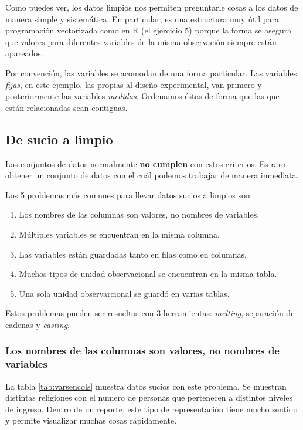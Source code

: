 \documentclass[]{article}
\begin{document}
Como puedes ver, los datos limpios nos permiten preguntarle cosas a los
datos de manera simple y sistemática. En particular, es una estructura
muy útil para programación vectorizada como en R (el ejercicio 5) porque
la forma se asegura que valores para diferentes variables de la misma
observación siempre están apareados.

Por convención, las variables se acomodan de una forma particular. Las
variables \emph{fijas}, en este ejemplo, las propias al diseño
experimental, van primero y posteriormente las variables \emph{medidas}.
Ordenamos éstas de forma que las que están relacionadas sean contiguas.

\subsection{De sucio a limpio}\label{de-sucio-a-limpio}

Los conjuntos de datos normalmente \textbf{no cumplen} con estos
criterios. Es raro obtener un conjunto de datos con el cuál podemos
trabajar de manera inmediata.

Los 5 problemas más comunes para llevar datos sucios a limpios son

\begin{enumerate}
\def\labelenumi{\arabic{enumi}.}
\itemsep1pt\parskip0pt
\item
  Los nombres de las columnas son valores, no nombres de variables.
\item
  Múltiples variables se encuentran en la misma columna.
\item
  Las variables están guardadas tanto en filas como en columnas.
\item
  Muchos tipos de unidad observacional se encuentran en la misma tabla.
\item
  Una sola unidad observarcional se guardó en varias tablas.
\end{enumerate}

Estos problemas pueden ser resueltos con 3 herramientas: \emph{melting},
separación de cadenas y \emph{casting}.

\subsubsection{Los nombres de las columnas son valores, no nombres de
variables}\label{los-nombres-de-las-columnas-son-valores-no-nombres-de-variables}

La tabla \ref{tab:varsencols} muestra datos sucios con este problema. Se
muestran distintas religiones con el numero de personas que pertenecen a
distintos niveles de ingreso. Dentro de un reporte, este tipo de
representación tiene mucho sentido y permite visualizar muchas cosas
rápidamente.
\end{document}
